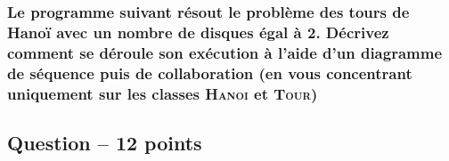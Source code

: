 \subsubsection{Le programme suivant résout le problème des tours de Hanoï avec un nombre de disques égal à 2. Décrivez comment se déroule son exécution à l'aide d'un diagramme de séquence puis de collaboration (en vous concentrant uniquement sur les classes \textsc{Hanoi} et \textsc{Tour})}

\begin{center}
    \color[rgb]{0,0.48,0.58}
\end{center}



\subsection{Question – 12 points}



